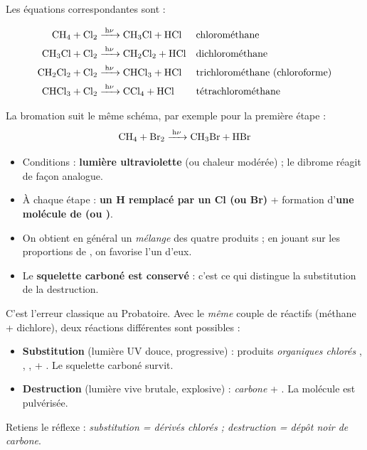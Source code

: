 \documentclass[11pt]{article}
\begin{document}
Les équations correspondantes sont :

\begin{align*}
\ce{CH4 + Cl2 &->[h\nu] CH3Cl + HCl} && \text{chlorométhane}\\
\ce{CH3Cl + Cl2 &->[h\nu] CH2Cl2 + HCl} && \text{dichlorométhane}\\
\ce{CH2Cl2 + Cl2 &->[h\nu] CHCl3 + HCl} && \text{trichlorométhane (chloroforme)}\\
\ce{CHCl3 + Cl2 &->[h\nu] CCl4 + HCl} && \text{tétrachlorométhane}
\end{align*}

La bromation suit le même schéma, par exemple pour la première étape :
\[ \ce{CH4 + Br2 ->[h\nu] CH3Br + HBr} \]

\begin{aretenir}
\begin{itemize}
\item Conditions : \textbf{lumière ultraviolette} (ou chaleur modérée) ; le dibrome  réagit de façon analogue.
\item À chaque étape : \textbf{un H remplacé par un Cl (ou Br)} + formation d'\textbf{une molécule de  (ou )}.
\item On obtient en général un \emph{mélange} des quatre produits ; en jouant sur les proportions de , on favorise l'un d'eux.
\item Le \textbf{squelette carboné est conservé} : c'est ce qui distingue la substitution de la destruction.
\end{itemize}
\end{aretenir}

\begin{attention}
C'est l'erreur classique au Probatoire. Avec le \emph{même} couple de réactifs (méthane + dichlore), deux réactions différentes sont possibles :
\begin{itemize}
\item \textbf{Substitution} (lumière UV douce, progressive) : produits \emph{organiques chlorés} , , ,  + . Le squelette carboné survit.
\item \textbf{Destruction} (lumière vive brutale, explosive) : \emph{carbone}  + . La molécule est pulvérisée.
\end{itemize}
Retiens le réflexe : \emph{substitution = dérivés chlorés ; destruction = dépôt noir de carbone}.
\end{attention}
\end{document}
